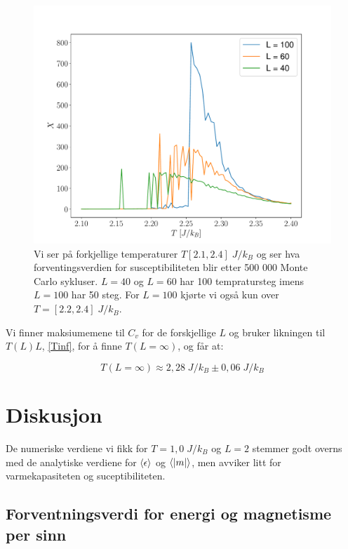 \documentclass[reprint,english,notitlepage]{revtex4-2}  %
\begin{document}
\begin{figure}[H]
\centering
\includegraphics[scale=0.4, trim=2.5cm 0 0 0 ]{../Images/XPerTAll.pdf}
\caption{Vi ser på forkjellige temperaturer $T [2.1, 2.4] \; J/k_B$ og ser hva forventingsverdien for susceptibiliteten blir etter 500 000 Monte Carlo sykluser. $L = 40$ og $L = 60$ har 100 tempratursteg imens $L = 100$ har 50 steg. For $L = 100$ kjørte vi også kun over $ T = [2.2, 2.4] \; J/k_B$.}
\label{Fig:XAll}
\end{figure}

Vi finner maksiumemene til $C_v$ for de forskjellige $L$ og bruker likningen til $T\left ( L \right ) L$, \eqref{Tinf}, for å finne $T \left ( L = \infty \right )$, og får at:

$$ T \left ( L = \infty \right ) \approx 2,28 \; J/k_B \pm 0,06 \; J/k_B$$

\section{Diskusjon}

De numeriske verdiene vi fikk for $T = 1,0 \; J/k_B$ og $L = 2$ stemmer godt overns med de analytiske verdiene for $\expval{\epsilon}$ og $\expval{|m|}$, men avviker litt for varmekapasiteten og suceptibiliteten.

\subsection*{Forventningsverdi for energi og magnetisme per sinn}
\end{document}
